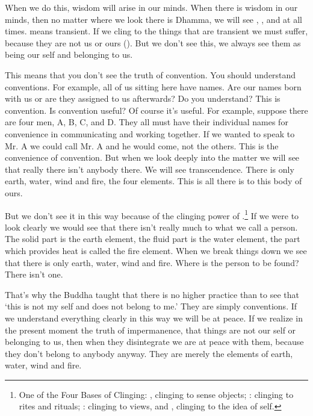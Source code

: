 When we do this, wisdom will arise in our minds. When there is wisdom in our minds, then no matter where we look there is Dhamma, we will see , , and  at all times.  means transient. If we cling to the things that are transient we must suffer,  because they are not us or ours (). But we don't see this, we always see them as being our self and belonging to us.

This means that you don't see the truth of convention. You should understand conventions. For example, all of us sitting here have names. Are our names born with us or are they assigned to us afterwards? Do you understand? This is convention. Is convention useful? Of course it's useful. For example, suppose there are four men, A, B, C, and D. They all must have their individual names for convenience in communicating and working together. If we wanted to speak to Mr. A we could call Mr. A and he would come, not the others. This is the convenience of convention. But when we look deeply into the matter we will see that really there isn't anybody there. We will see transcendence. There is only earth, water, wind and fire, the four elements. This is all there is to this body of ours.

But we don't see it in this way because of the clinging power of .\footnote{One of the Four Bases of Clinging: , clinging to sense objects; : clinging to rites and rituals; : clinging to views, and , clinging to the idea of self.} If we were to look clearly we would see that there isn't really much to what we call a person. The solid part is the earth element, the fluid part is the water element, the part which provides heat is called the fire element. When we break things down we see that there is only earth, water, wind and fire. Where is the person to be found? There isn't one.

That's why the Buddha taught that there is no higher practice than to see that `this is not my self and does not belong to me.' They are simply conventions. If we understand everything clearly in this way we will be at peace. If we realize in the present moment the truth of impermanence, that things are not our self or belonging to us, then when they disintegrate we are at peace with them, because they don't belong to anybody anyway. They are merely the elements of earth, water, wind and fire.

